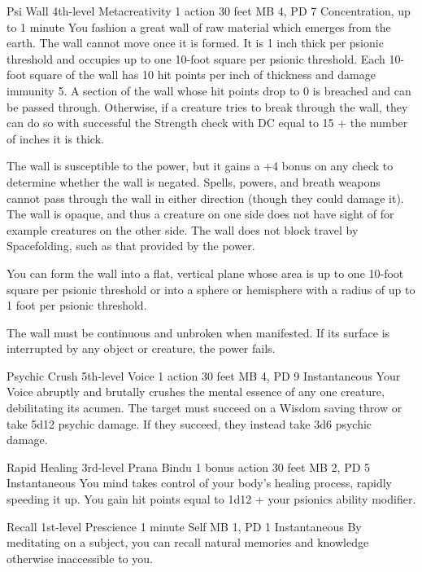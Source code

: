 \DndPowerHeader%
  {Psi Wall}
  {4th-level Metacreativity}
  {1 action}
  {30 feet}
  {MB 4, PD 7}
  {Concentration, up to 1 minute}
You fashion a great wall of raw material which emerges from the earth.
The wall cannot move once it is formed.
It is 1 inch thick per psionic threshold
and occupies up to one 10-foot square per psionic threshold.
Each 10-foot square of the wall has 10 hit points per inch of thickness
and damage immunity 5.
A section of the wall whose hit points drop to 0 is breached
and can be passed through.
Otherwise, if a creature tries to break through the wall,
they can do so with successful the Strength check with
DC equal to 15 + the number of inches it is thick.

The wall is susceptible to the  power,
but it gains a +4 bonus on any check
to determine whether the wall is negated.
Spells, powers, and breath weapons cannot pass through the wall
in either direction
(though they could damage it).
The wall is opaque, and thus a creature on one side does not have
sight of for example creatures on the other side.
The wall does not block travel by Spacefolding,
such as that provided by the  power.
  
You can form the wall into a flat, vertical plane
whose area is up to one 10-foot square per psionic threshold
or into a sphere or hemisphere
with a radius of up to 1 foot per psionic threshold.
  
The wall must be continuous and unbroken when manifested.
If its surface is interrupted by any object or creature,
the power fails.

\DndPowerHeader%
  {Psychic Crush}
  {5th-level Voice}
  {1 action}
  {30 feet}
  {MB 4, PD 9}
  {Instantaneous}
Your Voice abruptly and brutally crushes the mental essence
of any one creature, debilitating its acumen.
The target must succeed on a Wisdom saving throw
or take 5d12 psychic damage.
If they succeed, they instead take 3d6 psychic damage.

\DndPowerHeader%
  {Rapid Healing}
  {3rd-level Prana Bindu}
  {1 bonus action}
  {30 feet}
  {MB 2, PD 5}
  {Instantaneous}
You mind takes control of your body's healing process,
rapidly speeding it up.
You gain hit points equal to 1d12 + your psionics ability modifier.

\DndPowerHeader%
  {Recall}
  {1st-level Prescience}
  {1 minute}
  {Self}
  {MB 1, PD 1}
  {Instantaneous}
By meditating on a subject, you can recall
natural memories and knowledge otherwise inaccessible to you.

